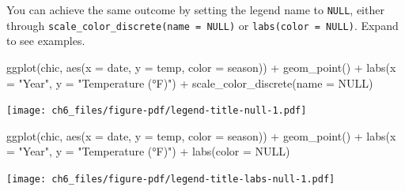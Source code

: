 \documentclass[
  letterpaper,
]{scrbook}
\newenvironment{Shaded}{\begin{snugshade}}{\end{snugshade}}
\newcommand{\AttributeTok}[1]{\textcolor[rgb]{0.40,0.45,0.13}{#1}}
\newcommand{\ConstantTok}[1]{\textcolor[rgb]{0.56,0.35,0.01}{#1}}
\newcommand{\FunctionTok}[1]{\textcolor[rgb]{0.28,0.35,0.67}{#1}}
\newcommand{\NormalTok}[1]{\textcolor[rgb]{0.00,0.23,0.31}{#1}}
\newcommand{\SpecialCharTok}[1]{\textcolor[rgb]{0.37,0.37,0.37}{#1}}
\newcommand{\StringTok}[1]{\textcolor[rgb]{0.13,0.47,0.30}{#1}}
\begin{document}
\begin{tcolorbox}[enhanced jigsaw, toprule=.15mm, bottomtitle=1mm, coltitle=black, breakable, colbacktitle=quarto-callout-tip-color!10!white, opacityback=0, toptitle=1mm, colframe=quarto-callout-tip-color-frame, titlerule=0mm, title=\textcolor{quarto-callout-tip-color}{\faLightbulb}\hspace{0.5em}{Other Ways to remove Legend Titles}, bottomrule=.15mm, arc=.35mm, opacitybacktitle=0.6, leftrule=.75mm, left=2mm, rightrule=.15mm, colback=white]

You can achieve the same outcome by setting the legend name to
\texttt{NULL}, either through
\texttt{scale\_color\_discrete(name\ =\ NULL)} or
\texttt{labs(color\ =\ NULL)}. Expand to see examples.

\begin{Shaded}
\begin{Highlighting}[]
\FunctionTok{ggplot}\NormalTok{(chic, }\FunctionTok{aes}\NormalTok{(}\AttributeTok{x =}\NormalTok{ date, }\AttributeTok{y =}\NormalTok{ temp, }\AttributeTok{color =}\NormalTok{ season)) }\SpecialCharTok{+}
  \FunctionTok{geom\_point}\NormalTok{() }\SpecialCharTok{+}
  \FunctionTok{labs}\NormalTok{(}\AttributeTok{x =} \StringTok{"Year"}\NormalTok{, }\AttributeTok{y =} \StringTok{"Temperature (°F)"}\NormalTok{) }\SpecialCharTok{+}
  \FunctionTok{scale\_color\_discrete}\NormalTok{(}\AttributeTok{name =} \ConstantTok{NULL}\NormalTok{)}
\end{Highlighting}
\end{Shaded}

\texttt{[image: ch6\_files/figure-pdf/legend-title-null-1.pdf]}

\begin{Shaded}
\begin{Highlighting}[]
\FunctionTok{ggplot}\NormalTok{(chic, }\FunctionTok{aes}\NormalTok{(}\AttributeTok{x =}\NormalTok{ date, }\AttributeTok{y =}\NormalTok{ temp, }\AttributeTok{color =}\NormalTok{ season)) }\SpecialCharTok{+}
  \FunctionTok{geom\_point}\NormalTok{() }\SpecialCharTok{+}
  \FunctionTok{labs}\NormalTok{(}\AttributeTok{x =} \StringTok{"Year"}\NormalTok{, }\AttributeTok{y =} \StringTok{"Temperature (°F)"}\NormalTok{) }\SpecialCharTok{+}
  \FunctionTok{labs}\NormalTok{(}\AttributeTok{color =} \ConstantTok{NULL}\NormalTok{)}
\end{Highlighting}
\end{Shaded}

\texttt{[image: ch6\_files/figure-pdf/legend-title-labs-null-1.pdf]}

\end{tcolorbox}
\end{document}
